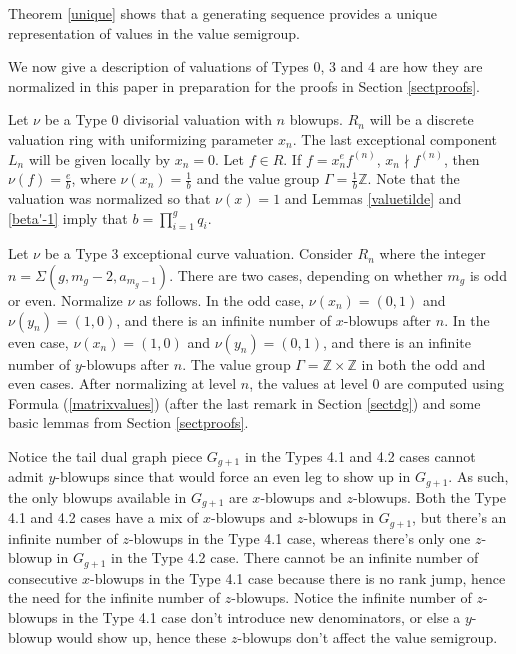 \documentclass[11pt]{amsart}
\theoremstyle{definition}
\begin{document}
{Theorem \ref{unique} shows that a generating sequence provides a unique representation of values in the value semigroup.

We now give a description of valuations of Types 0, 3 and 4 are how they are normalized in this paper in preparation for the proofs in Section \ref{sectproofs}.

Let $\nu$ be a Type 0 divisorial valuation with $n$ blowups. $R_n$ will be a discrete valuation ring with uniformizing parameter $x_n$. The last exceptional component $L_n$ will be given locally by $x_n=0$. Let $f\in R$. If $\displaystyle f=x_n^ef^{(n)}$, $x_n\nmid f^{(n)}$, then $\displaystyle \nu(f)=\frac{e}{b}$, where $\displaystyle \nu(x_n)=\frac{1}{b}$ and the value group $\displaystyle \Gamma = \frac{1}{b}\mathbb{Z}$. Note that the valuation was normalized so that $\nu(x)=1$ and Lemmas \ref{valuetilde} and \ref{beta'-1} imply that $\displaystyle b=\prod_{i=1}^{g} q_i$.

Let $\nu$ be a Type 3 exceptional curve valuation. Consider $R_n$ where the integer $\displaystyle n=\Sigma(g,m_g-2,a_{m_g-1})$. There are two cases, depending on whether $m_g$ is odd or even. Normalize $\nu$ as follows. In the odd case, $\nu(x_n)=(0,1)$ and $\nu(y_n)=(1,0)$, and there is an infinite number of $x$-blowups after $n$. In the even case, $\nu(x_n)=(1,0)$ and $\nu(y_n)=(0,1)$, and there is an infinite number of $y$-blowups after $n$. The value group $\Gamma = \mathbb{Z}\times\mathbb{Z}$ in both the odd and even cases. After normalizing at level $n$, the values at level 0 are computed using Formula (\ref{matrixvalues}) (after the last remark in Section \ref{sectdg}) and some basic lemmas from Section \ref{sectproofs}.

Notice the tail dual graph piece $G_{g+1}$ in the Types 4.1 and 4.2 cases cannot admit $y$-blowups since that would force an even leg to show up in $G_{g+1}$. As such, the only blowups available in $G_{g+1}$ are $x$-blowups and $z$-blowups. Both the Type 4.1 and 4.2 cases have a mix of $x$-blowups and $z$-blowups in $G_{g+1}$, but there's an infinite number of $z$-blowups in the Type 4.1 case, whereas there's only one $z$-blowup in $G_{g+1}$ in the Type 4.2 case. There cannot be an infinite number of consecutive $x$-blowups in the Type 4.1 case because there is no rank jump, hence the need for the infinite number of $z$-blowups. Notice the infinite number of $z$-blowups in the Type 4.1 case don't introduce new denominators, or else a $y$-blowup would show up, hence these $z$-blowups don't affect the value semigroup.

}
\end{document}
